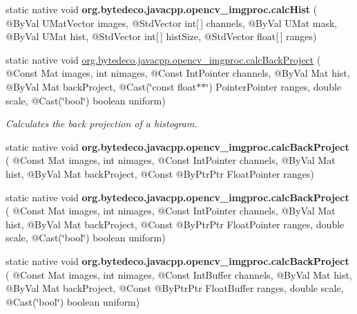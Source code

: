 \begin{DoxyCompactItemize}
\item 
\mbox{\label{group__imgproc__hist_gad2ffb7df0f088c57acd50282521c7459}} 
static native void {\bfseries org.\+bytedeco.\+javacpp.\+opencv\+\_\+imgproc.\+calc\+Hist} ( @By\+Val U\+Mat\+Vector images, @Std\+Vector int\mbox{[}$\,$\mbox{]} channels, @By\+Val U\+Mat mask, @By\+Val U\+Mat hist, @Std\+Vector int\mbox{[}$\,$\mbox{]} hist\+Size, @Std\+Vector float\mbox{[}$\,$\mbox{]} ranges)
\item 
static native void \hyperlink{group__imgproc__hist_gaf0312cafdf92e7baeb662d460281307e}{org.\+bytedeco.\+javacpp.\+opencv\+\_\+imgproc.\+calc\+Back\+Project} ( @Const Mat images, int nimages, @Const Int\+Pointer channels, @By\+Val Mat hist, @By\+Val Mat back\+Project, @Cast(\char`\"{}const float$\ast$$\ast$\char`\"{}) Pointer\+Pointer ranges, double scale, @Cast(\char`\"{}bool\char`\"{}) boolean uniform)
\begin{DoxyCompactList}\small\item\em Calculates the back projection of a histogram. \end{DoxyCompactList}\item 
\mbox{\label{group__imgproc__hist_gac92a2ab6b4738fd23a9b0cc7f42684ba}} 
static native void {\bfseries org.\+bytedeco.\+javacpp.\+opencv\+\_\+imgproc.\+calc\+Back\+Project} ( @Const Mat images, int nimages, @Const Int\+Pointer channels, @By\+Val Mat hist, @By\+Val Mat back\+Project, @Const @By\+Ptr\+Ptr Float\+Pointer ranges)
\item 
\mbox{\label{group__imgproc__hist_gabdda69d5a6387c13016f74dc6fe231cd}} 
static native void {\bfseries org.\+bytedeco.\+javacpp.\+opencv\+\_\+imgproc.\+calc\+Back\+Project} ( @Const Mat images, int nimages, @Const Int\+Pointer channels, @By\+Val Mat hist, @By\+Val Mat back\+Project, @Const @By\+Ptr\+Ptr Float\+Pointer ranges, double scale, @Cast(\char`\"{}bool\char`\"{}) boolean uniform)
\item 
\mbox{\label{group__imgproc__hist_gaea96bfc08cb0cc264d4ec1709f87fe7a}} 
static native void {\bfseries org.\+bytedeco.\+javacpp.\+opencv\+\_\+imgproc.\+calc\+Back\+Project} ( @Const Mat images, int nimages, @Const Int\+Buffer channels, @By\+Val Mat hist, @By\+Val Mat back\+Project, @Const @By\+Ptr\+Ptr Float\+Buffer ranges, double scale, @Cast(\char`\"{}bool\char`\"{}) boolean uniform)
$$
\end{DoxyCompactItemize}

